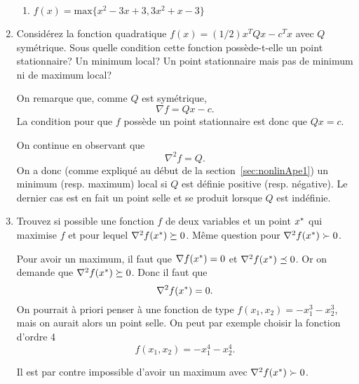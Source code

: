 \begin{enumerate}
\begin{enumerate}
    \item $f(x) = \mbox{max}\{x^2 - 3x + 3, 3x^2 + x - 3\}$
          
  \end{enumerate}
  
  \item Considérez la fonction quadratique $f(x)=(1/2) x^T Q x-c^T x$ 
  avec $Q$ symétrique. Sous quelle condition cette fonction possède-t-elle un
    point stationnaire? 
    Un minimum local? 
    Un point stationnaire mais pas de minimum ni de maximum local?

    \begin{solution}
      On remarque que, comme $Q$ est symétrique,
      \[\nabla f = Qx - c.\]
      La condition pour que $f$ possède un point stationnaire
      est donc que $Qx = c$.
      
      On continue en observant que 
      \[\nabla^2 f = Q.\]
      On a donc (comme expliqué au début de la section~\ref{sec:nonlinApe1})
      un minimum (resp. maximum) local si $Q$ est définie positive (resp. négative).
      Le dernier cas est en fait un point selle
      et se produit lorsque $Q$ est indéfinie.
    \end{solution}
  
  \item Trouvez si possible une fonction $f$ de deux variables 
  et un point $x^*$ qui maximise $f$ 
  et pour lequel $\nabla^2 f(x^*) \succeq 0$. 
  Même question pour $\nabla^2 f(x^*) \succ 0$.

    \begin{solution}
      Pour avoir un maximum, il faut que $\nabla f(x^*) = 0$ 
      et $\nabla^2 f(x^*) \preceq 0$.
      Or on demande que $\nabla^2 f(x^*) \succeq 0$.
      Donc il faut que
      \[\nabla^2 f(x^*) = 0.\]
      On pourrait à priori penser à une fonction de type $f(x_1,x_2) = -x_1^3-x_2^3$,
      mais on aurait alors un point selle.
      On peut par exemple choisir la fonction d'ordre 4
      \[f(x_1,x_2) = -x_1^4-x_2^4.\]
      
      Il est par contre impossible d'avoir un maximum 
      avec $\nabla^2 f(x^*) \succ 0$.
    \end{solution}
  

\end{enumerate}
